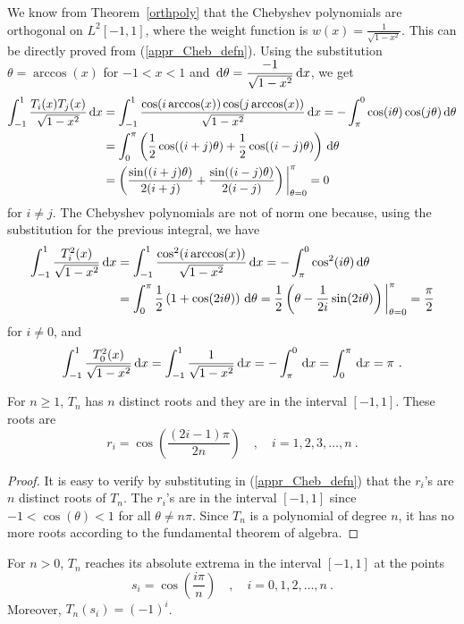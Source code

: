 We know from Theorem~\ref{orthpoly} that the Chebyshev polynomials are
orthogonal on $L^2[-1,1]$, where the weight function is
$\displaystyle w(x) = \frac{1}{\sqrt{1-x^2}}$.  This can be directly proved
from (\ref{appr_Cheb_defn}).  Using the substitution
$\theta= \arccos(x)$ for $-1<x<1$ and
$\displaystyle \,\mathrm{d}\theta = \frac{-1}{\sqrt{1-x^2}}\,\mathrm{d}x$, we get
\begin{align*}
\int_{-1}^1 \frac{T_i(x)T_j(x)}{\sqrt{1-x^2}} \,\mathrm{d}x &
= \int_{-1}^1 \frac{\cos(i\arccos(x))\cos(j\arccos(x))}{\sqrt{1-x^2}} \,\mathrm{d}x
= - \int_{\pi}^0 \cos(i\theta)\cos(j\theta) \,\mathrm{d}\theta \\
&= \int_0^\pi \left(\frac{1}{2}\cos((i+j)\theta) +
  \frac{1}{2}\cos((i-j)\theta) \right)\,\mathrm{d}\theta \\
&= \left(\frac{\sin((i+j)\theta)}{2(i+j)} +
  \frac{\sin((i-j)\theta)}{2(i-j)}\right) \bigg|_{\theta=0}^\pi
= 0
\end{align*}
for $i\neq j$.  The Chebyshev polynomials are not of norm one
because, using the substitution for the previous integral, we have
\begin{align*}
\int_{-1}^1 \frac{T_i^2(x)}{\sqrt{1-x^2}} \,\mathrm{d}x
&= \int_{-1}^1 \frac{\cos^2(i\arccos(x))}{\sqrt{1-x^2}} \,\mathrm{d}x
= - \int_{\pi}^0 \cos^2(i\theta) \,\mathrm{d}\theta \\
&= \int_0^\pi \frac{1}{2}\left(1+ \cos(2i\theta) \right)\,\mathrm{d}\theta
= \frac{1}{2} \left(\theta - \frac{1}{2i}\sin(2i\theta)
\right)\bigg|_{\theta=0}^\pi = \frac{\pi}{2}
\end{align*}
for  $i\neq 0$, and
\[
\int_{-1}^1 \frac{T_0^2(x)}{\sqrt{1-x^2}} \,\mathrm{d}x
= \int_{-1}^1 \frac{1}{\sqrt{1-x^2}} \,\mathrm{d}x = - \int_\pi^0 \,\mathrm{d}x
= \int_0^\pi \,\mathrm{d}x = \pi \  .
\]

\begin{prop}
For $n\geq 1$, $T_n$ has $n$ distinct roots and they are in the interval
$[-1,1]$.  These roots are
\[
r_i = \cos\left( \frac{(2i-1)\pi}{2n}\right) \quad , \quad
i=1,2,3,\ldots,n \ .
\]
\end{prop}

\begin{proof}
It is easy to verify by substituting in (\ref{appr_Cheb_defn}) that the
$r_i$'s are $n$ distinct roots of $T_n$.  The $r_i$'s are in the interval
$[-1,1]$ since $-1<\cos(\theta)<1$ for all $\theta \neq n\pi$.  Since $T_n$
is a polynomial of degree $n$, it has no more roots according to the
fundamental theorem of algebra.
\end{proof}

\begin{prop}
For $n>0$, $T_n$ reaches its absolute extrema in the interval $[-1,1]$ at the
points
\[
s_i = \cos\left(\frac{i\pi}{n}\right) \quad , \quad i=0,1,2,\ldots, n \ .
\]
Moreover, $T_n(s_i) = (-1)^i$.
\end{prop}

